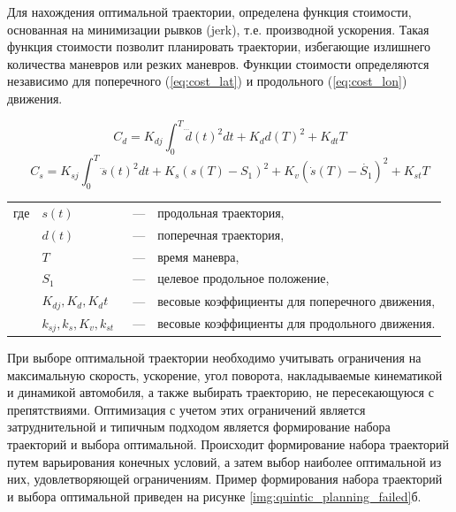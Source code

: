 Для нахождения оптимальной траектории, определена функция стоимости, основанная на минимизации рывков
(jerk), т.е. производной ускорения. Такая функция стоимости позволит планировать траектории, избегающие
излишнего количества маневров или резких маневров. Функции стоимости определяются независимо для
поперечного (\ref{eq:cost_lat}) и продольного (\ref{eq:cost_lon}) движения.

\begin{equation}
    \label{eq:cost_lat}
    C_d = K_{dj} \int_{0}^{T}{\dddot{d}(t)^2dt} + K_d d(T)^2 + K_{dt} T
\end{equation}
\begin{equation}
    \label{eq:cost_lon}
    C_s = K_{sj} \int_{0}^{T}{\dddot{s}(t)^2dt} + K_s (s(T) - S_1)^2 + K_v (\dot{s}(T) - \dot{S_1})^2 + K_{st} T
\end{equation}

\noindent\begin{tabularx}{\linewidth}{lllX}
    где & $s(t)$         &~---& продольная траектория, \\
        & $d(t)$         &~---& поперечная траектория, \\
        & $T$            &~---& время маневра, \\
        & $S_1$   &~---& целевое продольное положение, \\
        & $K_{dj}, K_d, K_dt$ &~---& весовые коэффициенты для поперечного движения,\\
        & $k_{sj}, k_s, K_v, k_{st}$ &~---& весовые коэффициенты для продольного движения.
\end{tabularx}

При выборе оптимальной траектории необходимо учитывать ограничения на максимальную скорость, ускорение,
угол поворота, накладываемые кинематикой и динамикой автомобиля, а также выбирать траекторию, не
пересекающуюся с препятствиями. Оптимизация с учетом этих ограничений является затруднительной и
типичным подходом является формирование набора траекторий и выбора оптимальной. Происходит формирование
набора траекторий путем варьирования конечных условий, а затем выбор наиболее оптимальной из них,
удовлетворяющей ограничениям. Пример формирования набора траекторий и выбора оптимальной приведен на
рисунке \ref{img:quintic_planning_failed}б.

